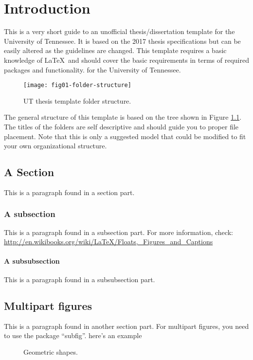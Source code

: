 \chapter{Introduction} \label{chapter1}

This is a very short guide to an unofficial thesis/dissertation template
for the University of Tennessee.
It is based on the 2017 thesis specifications but can be easily altered
as the guidelines are changed.
This template requires a basic knowledge of \LaTeX\ and should cover
the basic requirements in terms of required packages and functionality.
for the University of Tennessee.

\begin{figure}[!b]
  \centering
  \texttt{[image: fig01-folder-structure]}\\
  \caption{UT thesis template folder structure.}
  \label{intro-folder-structure}
\end{figure}

The general structure of this template is based on the tree shown in
Figure \ref{intro-folder-structure}.
The titles of the folders are self descriptive and should guide you to proper file placement.
Note that this is only a suggested model that could be
modified to fit your own organizational structure.

\section{A Section}
This is a paragraph found in a section part.

\subsection{A subsection}
This is a paragraph found in a subsection part.
For more information, check: \href{http://en.wikibooks.org/wiki/LaTeX/Floats,_Figures_and_Captions}{http://en.wikibooks.org/wiki/LaTeX/Floats,\_Figures\_and\_Captions}

\subsubsection{A subsubsection}
This is a paragraph found in a subsubsection part.

\section{Multipart figures}
This is a paragraph found in another section part.
For multipart figures, you need to use the package ``subfig''. here's an example
\begin{figure}[!htb]
        \centering
        \caption{Geometric shapes.}
        \label{multipart-figure}
\end{figure}


